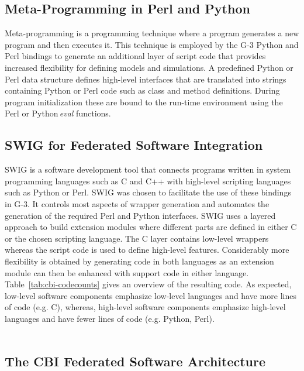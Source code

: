 \documentclass[10pt]{article}
\begin{document}
\subsection*{Meta-Programming in Perl and Python}

Meta-programming is a programming technique where a program generates
a new program and then executes it.  This technique is employed by
the G-3 Python and Perl bindings to generate an
additional layer of script code that provides increased flexibility
for defining models and simulations.  A predefined Python  or
Perl data structure defines high-level interfaces that are translated
into strings containing Python or Perl code such as class and method
definitions.  During program initialization these are bound to the run-time
environment using the Perl or Python\,{\it eval} functions.

\subsection*{SWIG for Federated Software Integration}

SWIG is a software development tool that connects programs written
in system programming languages such as C and C++ with high-level scripting 
languages such as Python or Perl. SWIG was chosen to facilitate 
the use of these bindings in
G-3. It controls most aspects of wrapper
generation and automates the generation of the required Perl and
Python interfaces. SWIG uses a layered approach to build extension
modules where different parts are defined in either C or the chosen
scripting language. The C layer contains low-level wrappers whereas
the script code is used to define high-level features.  Considerably
more flexibility is obtained by generating code in both languages as
an extension module can then be enhanced with support code in either
language.  Table~\ref{tab:cbi-codecounts} gives an overview of the
resulting code.  As expected, low-level software components emphasize
low-level languages and have more lines of code (e.g. C), whereas, high-level
software components emphasize high-level languages and have fewer
lines of code (e.g. Python, Perl).\\

\\

\subsection*{The CBI Federated Software Architecture}
\label{subsec:cbi}
\end{document}
